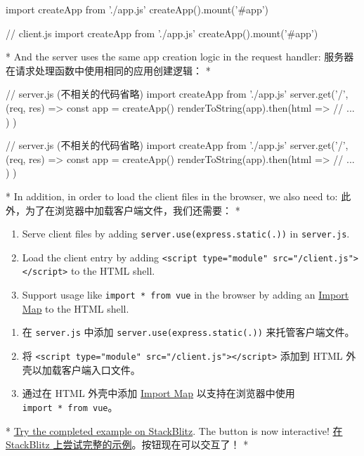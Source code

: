 \begin{paracol}{2}
\begin{codeJs}
import { createApp } from './app.js'
createApp().mount('#app')
\end{codeJs}
\switchcolumn
\begin{codeJs}
// client.js
import { createApp } from './app.js'
createApp().mount('#app')
\end{codeJs}
\switchcolumn[0]*%
And the server uses the same app creation logic in the request handler:
\switchcolumn
服务器在请求处理函数中使用相同的应用创建逻辑：
\switchcolumn[0]*%
\begin{codeJs}
// server.js (不相关的代码省略)
import { createApp } from './app.js'
server.get('/', (req, res) => {
  const app = createApp()
  renderToString(app).then(html => {
    // ...
  })
})
\end{codeJs}
\switchcolumn
\begin{codeJs}
// server.js (不相关的代码省略)
import { createApp } from './app.js'
server.get('/', (req, res) => {
  const app = createApp()
  renderToString(app).then(html => {
    // ...
  })
})
\end{codeJs}
\switchcolumn[0]*%
In addition, in order to load the client files in the browser, we also
need to:
\switchcolumn
此外，为了在浏览器中加载客户端文件，我们还需要：
\switchcolumn[0]*%
\begin{enumerate}
\item
  Serve client files by adding
  \texttt{server.use(express.static(\textquotesingle{}.\textquotesingle{}))}
  in \texttt{server.js}.
\item
  Load the client entry by adding
  \texttt{\textless{}script\ type="module"\ src="/client.js"\textgreater{}\textless{}/script\textgreater{}}
  to the HTML shell.
\item
  Support usage like
  \texttt{import\ *\ from\ \textquotesingle{}vue\textquotesingle{}} in
  the browser by adding an
  \href{https://github.com/WICG/import-maps}{Import Map} to the HTML
  shell.
\end{enumerate}
\switchcolumn
\begin{enumerate}
\item
  在 \texttt{server.js} 中添加
  \texttt{server.use(express.static(\textquotesingle{}.\textquotesingle{}))}
  来托管客户端文件。
\item
  将
  \texttt{\textless{}script\ type="module"\ src="/client.js"\textgreater{}\textless{}/script\textgreater{}}
  添加到 HTML 外壳以加载客户端入口文件。
\item
  通过在 HTML 外壳中添加
  \href{https://github.com/WICG/import-maps}{Import Map}
  以支持在浏览器中使用
  \texttt{import\ *\ from\ \textquotesingle{}vue\textquotesingle{}}。
\end{enumerate}
\switchcolumn[0]*%
\href{https://stackblitz.com/fork/vue-ssr-example?file=index.js}{Try the
completed example on StackBlitz}. The button is now interactive!
\switchcolumn
\href{https://stackblitz.com/fork/vue-ssr-example?file=index.js}{在
StackBlitz 上尝试完整的示例}。按钮现在可以交互了！
\switchcolumn[0]*%

\end{paracol}
